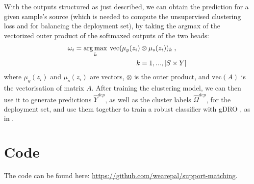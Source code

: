 With the outputs structured as just described, we can obtain the prediction for a given sample's
source (which is needed to compute the unsupervised clustering loss and for balancing the
deployment set), by taking the argmax of the vectorized outer product of the softmaxed outputs of
the two heads:
%
\begin{align}
&\omega_i = \operatorname*{arg\,max}\limits_{k} \: \mathrm{vec}(\mu_y(z_i) \otimes \mu_s(z_i))_k\;,\\
&\quad\quad\quad\quad\quad\quad\quad\quad\quad\quad k = 1, ..., |S \times Y| \nonumber
\end{align}
%
where $\mu_y(z_i)$ and $\mu_s(z_i)$ are vectors, $\otimes$ is the outer product, and
$\mathrm{vec}(A)$ is the vectorisation of matrix $A$. 
%
After training the clustering model, we can then use it to generate predictions $\hat{Y}^{dep}$, as
well as the cluster labels $\hat{\Omega}^{dep}$, for the deployment set, and use them together to
train a robust classifier with gDRO \citep{sagawa2019distributionally}, as in
\citet{SohDunAngGuetal20}.
%
\section{Code}
%
The code can be found here: \url{https://github.com/wearepal/support-matching}.
%
